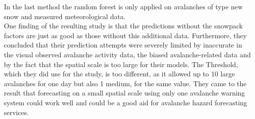 \documentclass[../masterarbeit.tex]{subfiles}
\begin{document}
In the last method the random forest is only applied on avalanches of type new snow and measured meteorological data. \autocite[]{Harvey:2016}\\
One finding of the resulting study is that the predictions without the snowpack factors are just as good as those without this additional data. Furthermore, they concluded that their prediction attempts were severely limited by inaccurate in the visual observed avalanche activity data, the biased avalanche-related data and by the fact that the spatial scale is too large for their models. The Threshold, which they did use for the study, is too different, as it allowed up to 10 large avalanches for one day but also 1 medium, for the same value. They came to the result that forecasting on a small spatial scale using only one avalanche warning system could work well and could be a good aid for avalanche hazard forecasting services. \autocite[]{Harvey:2016}\\~\\
 
\end{document}
